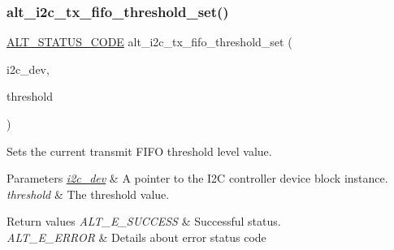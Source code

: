 \subsubsection{\texorpdfstring{alt\_i2c\_tx\_fifo\_threshold\_set()}{alt\_i2c\_tx\_fifo\_threshold\_set()}}
{\footnotesize\ttfamily \mbox{\hyperlink{hwlib_8h_abdb0d369f069723ca55d6c94bcaaaa12}{A\+L\+T\+\_\+\+S\+T\+A\+T\+U\+S\+\_\+\+C\+O\+DE}} alt\+\_\+i2c\+\_\+tx\+\_\+fifo\+\_\+threshold\+\_\+set (\begin{DoxyParamCaption}\item[{\mbox{\hyperlink{structALT__I2C__DEV__s}{A\+L\+T\+\_\+\+I2\+C\+\_\+\+D\+E\+V\+\_\+t}} $\ast$}]{i2c\+\_\+dev,  }\item[{const uint8\+\_\+t}]{threshold }\end{DoxyParamCaption})}

Sets the current transmit F\+I\+FO threshold level value.


\begin{DoxyParams}{Parameters}
{\em \mbox{\hyperlink{structi2c__dev}{i2c\+\_\+dev}}} & A pointer to the I2C controller device block instance.\\
\hline
{\em threshold} & The threshold value.\\
\hline
\end{DoxyParams}

\begin{DoxyRetVals}{Return values}
{\em A\+L\+T\+\_\+\+E\+\_\+\+S\+U\+C\+C\+E\+SS} & Successful status. \\
\hline
{\em A\+L\+T\+\_\+\+E\+\_\+\+E\+R\+R\+OR} & Details about error status code \\
\hline
\end{DoxyRetVals}
